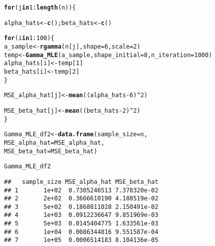 \documentclass[11pt, a4paper]{article}\usepackage[]{graphicx}\usepackage[]{xcolor}
\makeatletter
\newcommand{\hlnum}[1]{\textcolor[rgb]{0.686,0.059,0.569}{#1}}%
\newcommand{\hlopt}[1]{\textcolor[rgb]{0,0,0}{#1}}%
\newcommand{\hldef}[1]{\textcolor[rgb]{0.345,0.345,0.345}{#1}}%
\newcommand{\hlkwa}[1]{\textcolor[rgb]{0.161,0.373,0.58}{\textbf{#1}}}%
\newcommand{\hlkwb}[1]{\textcolor[rgb]{0.69,0.353,0.396}{#1}}%
\newcommand{\hlkwc}[1]{\textcolor[rgb]{0.333,0.667,0.333}{#1}}%
\newcommand{\hlkwd}[1]{\textcolor[rgb]{0.737,0.353,0.396}{\textbf{#1}}}%
\newenvironment{kframe}{%
 \def\at@end@of@kframe{}%
 \ifinner\ifhmode%
  \def\at@end@of@kframe{\end{minipage}}%
  \begin{minipage}{\columnwidth}%
 \fi\fi%
 \def\FrameCommand##1{\hskip\@totalleftmargin \hskip-\fboxsep
 \colorbox{shadecolor}{##1}\hskip-\fboxsep
     \hskip-\linewidth \hskip-\@totalleftmargin \hskip\columnwidth}%
 \MakeFramed {\advance\hsize-\width
   \@totalleftmargin\z@ \linewidth\hsize
   \@setminipage}}%
 {\par\unskip\endMakeFramed%
 \at@end@of@kframe}
\newenvironment{knitrout}{}{} %
\makeatother
\begin{document}
\begin{knitrout}
\color{fgcolor}\begin{kframe}
\begin{alltt}
\hlkwa{for}\hldef{(j} \hlkwa{in} \hlnum{1}\hlopt{:}\hlkwd{length}\hldef{(n))\{}

  \hldef{alpha_hats} \hlkwb{<-} \hlkwd{c}\hldef{(); beta_hats} \hlkwb{<-} \hlkwd{c}\hldef{()}

  \hlkwa{for} \hldef{(i} \hlkwa{in} \hlnum{1}\hlopt{:}\hlnum{100}\hldef{) \{}
    \hldef{a_sample} \hlkwb{<-} \hlkwd{rgamma}\hldef{(n[j],} \hlkwc{shape} \hldef{=} \hlnum{6}\hldef{,} \hlkwc{scale} \hldef{=} \hlnum{2}\hldef{)}
    \hldef{temp} \hlkwb{<-} \hlkwd{Gamma_MLE}\hldef{(a_sample,} \hlkwc{shape_initial} \hldef{=} \hlnum{8}\hldef{,} \hlkwc{n_iteration} \hldef{=} \hlnum{1000}\hldef{)}
    \hldef{alpha_hats[i]} \hlkwb{<-} \hldef{temp[}\hlnum{1}\hldef{]}
    \hldef{beta_hats[i]} \hlkwb{<-} \hldef{temp[}\hlnum{2}\hldef{]}
  \hldef{\}}

  \hldef{MSE_alpha_hat[j]} \hlkwb{<-} \hlkwd{mean}\hldef{( (alpha_hats} \hlopt{-} \hlnum{6}\hldef{)}\hlopt{^}\hlnum{2} \hldef{)}

  \hldef{MSE_beta_hat[j]} \hlkwb{<-} \hlkwd{mean}\hldef{( (beta_hats} \hlopt{-} \hlnum{2}\hldef{)}\hlopt{^}\hlnum{2} \hldef{)}
\hldef{\}}
\end{alltt}
\end{kframe}
\end{knitrout}

\begin{knitrout}
\color{fgcolor}\begin{kframe}
\begin{alltt}
\hldef{Gamma_MLE_df2} \hlkwb{<-} \hlkwd{data.frame}\hldef{(}\hlkwc{sample_size} \hldef{= n,}
                            \hlkwc{MSE_alpha_hat} \hldef{= MSE_alpha_hat,}
                            \hlkwc{MSE_beta_hat} \hldef{= MSE_beta_hat)}
\end{alltt}
\end{kframe}
\end{knitrout}

\begin{knitrout}
\color{fgcolor}\begin{kframe}
\begin{alltt}
\hldef{Gamma_MLE_df2}
\end{alltt}
\begin{verbatim}
##   sample_size MSE_alpha_hat MSE_beta_hat
## 1       1e+02  0.7305246513 7.378320e-02
## 2       2e+02  0.3666610190 4.180519e-02
## 3       5e+02  0.1868811028 2.150491e-02
## 4       1e+03  0.0912236647 9.851969e-03
## 5       5e+03  0.0145404775 1.633561e-03
## 6       1e+04  0.0086344816 9.551587e-04
## 7       1e+05  0.0006514183 8.104136e-05
\end{verbatim}
\end{kframe}
\end{knitrout}
\end{document}
